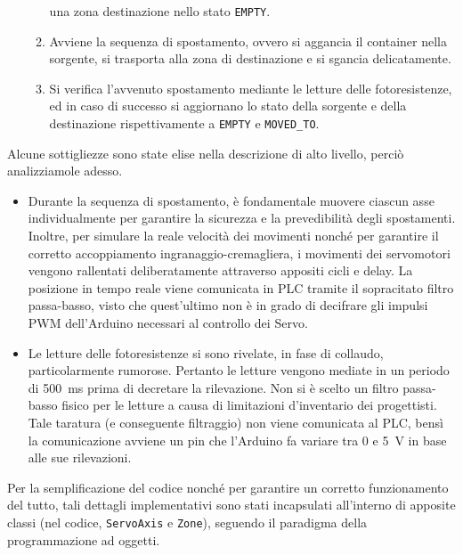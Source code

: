\begin{enumerate}
\begin{enumerate}
                una zona destinazione nello stato \texttt{EMPTY}.
            \item Avviene la sequenza di spostamento, ovvero si aggancia il container nella
                sorgente, si trasporta alla zona di destinazione e si sgancia delicatamente.
            \item Si verifica l'avvenuto spostamento mediante le letture delle fotoresistenze, ed in
                caso di successo si aggiornano lo stato della sorgente e della destinazione
                rispettivamente a \texttt{EMPTY} e \texttt{MOVED\_TO}.
        \end{enumerate}
\end{enumerate}

Alcune sottigliezze sono state elise nella descrizione di alto livello, perciò analizziamole adesso.
\begin{itemize}
    \item Durante la sequenza di spostamento, è fondamentale muovere ciascun asse individualmente
        per garantire la sicurezza e la prevedibilità degli spostamenti. Inoltre, per simulare la
        reale velocità dei movimenti nonché per garantire il corretto accoppiamento
        ingranaggio-cremagliera, i movimenti dei servomotori vengono rallentati deliberatamente
        attraverso appositi cicli e delay. La posizione in tempo reale viene comunicata in PLC
        tramite il sopracitato filtro passa-basso, visto che quest'ultimo non è in grado di
        decifrare gli impulsi PWM dell'Arduino necessari al controllo dei Servo.
    \item Le letture delle fotoresistenze si sono rivelate, in fase di collaudo, particolarmente
        rumorose. Pertanto le letture vengono mediate in un periodo di \qty{500}{\milli\second}
        prima di decretare la rilevazione. Non si è scelto un filtro passa-basso fisico per le
        letture a causa di limitazioni d'inventario dei progettisti. Tale taratura (e conseguente
        filtraggio) non viene comunicata al PLC, bensì la comunicazione avviene un pin
         che l'Arduino fa variare tra \num{0} e \qty{5}{\volt} in base alle sue
        rilevazioni.
\end{itemize}
Per la semplificazione del codice nonché per garantire un corretto funzionamento del tutto, tali
dettagli implementativi sono stati incapsulati all'interno di apposite classi (nel codice,
\texttt{ServoAxis} e \texttt{Zone}), seguendo il paradigma della programmazione ad oggetti.


